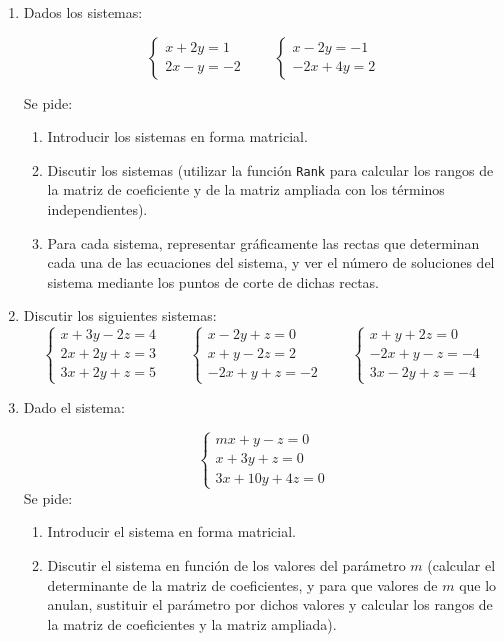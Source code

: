 \documentclass[a4paper]{article}
\begin{document}
\begin{enumerate}[leftmargin=*]
\item Dados los sistemas:

\[\left\{
\begin{array}{l}
x+2y=1 \\
2x-y=-2
\end{array}\right.
\qquad
\left\{
\begin{array}{l}
x-2y=-1 \\
-2x+4y=2
\end{array}\right.
\]

Se pide:
\begin{enumerate}
\item Introducir los sistemas en forma matricial.
\item Discutir los sistemas (utilizar la función \texttt{Rank} para calcular los rangos de la matriz de coeficiente y de la matriz ampliada con los términos independientes).
\item Para cada sistema, representar gráficamente las rectas que determinan cada una de las ecuaciones del sistema, y ver el número de soluciones del sistema mediante los puntos de corte de dichas rectas.
\end{enumerate}

\item Discutir los siguientes sistemas:
\[
\left\{
\begin{array}{l}
x+3y-2z=4 \\
2x+2y+z=3 \\
3x+2y+z=5 
\end{array}\right.
\qquad
\left\{
\begin{array}{l}
x-2y+z=0 \\
x+y-2z=2 \\
-2x+y+z=-2 
\end{array}\right.
\qquad
\left\{
\begin{array}{l}
x+y+2z=0 \\
-2x+y-z=-4 \\
3x-2y+z=-4 
\end{array}\right.
\]

\item Dado el sistema:

\[
\left\{
\begin{array}{l}
mx+y-z=0 \\
x+3y+z=0 \\
3x+10y+4z=0  
\end{array}\right.
\]
Se pide:
\begin{enumerate}
\item Introducir el sistema en forma matricial.
\item Discutir el sistema en función de los valores del parámetro $m$ (calcular el determinante de la matriz de coeficientes, y para que valores de $m$ que lo anulan, sustituir el parámetro por dichos valores y calcular los rangos de la matriz de coeficientes y la matriz ampliada).
\end{enumerate}


\end{enumerate}
\end{document}
